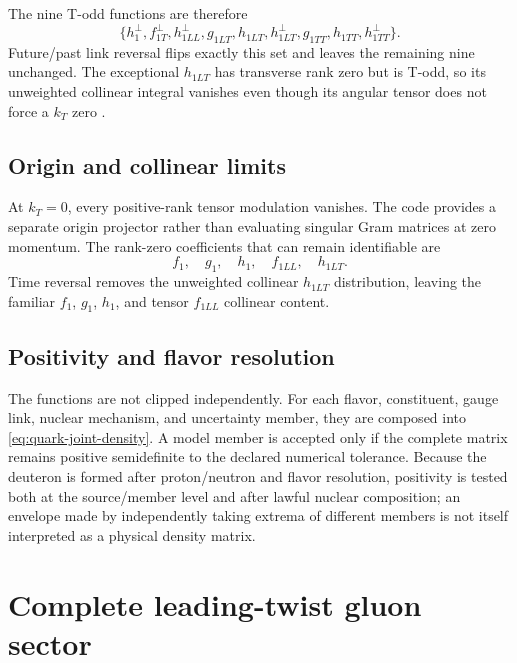 \documentclass[11pt,oneside]{book}
\begin{document}
The nine T-odd functions are therefore
\begin{equation}
 \{h_1^\perp,f_{1T}^\perp,h_{1LL}^\perp,g_{1LT},h_{1LT},
 h_{1LT}^\perp,g_{1TT},h_{1TT},h_{1TT}^\perp\}.
 \label{eq:quark-todd-set}
\end{equation}
Future/past link reversal flips exactly this set and leaves the remaining nine unchanged.  The exceptional $h_{1LT}$ has transverse rank zero but is T-odd, so its unweighted collinear integral vanishes even though its angular tensor does not force a $k_T$ zero \cite{VanDaal2016,KumanoSong2021}.

\section{Origin and collinear limits}

At $k_T=0$, every positive-rank tensor modulation vanishes.  The code provides a separate origin projector rather than evaluating singular Gram matrices at zero momentum.  The rank-zero coefficients that can remain identifiable are
\begin{equation}
 f_1,\quad g_1,\quad h_1,\quad f_{1LL},\quad h_{1LT}.
 \label{eq:quark-origin-set}
\end{equation}
Time reversal removes the unweighted collinear $h_{1LT}$ distribution, leaving the familiar $f_1$, $g_1$, $h_1$, and tensor $f_{1LL}$ collinear content.

\section{Positivity and flavor resolution}

The functions are not clipped independently.  For each flavor, constituent, gauge link, nuclear mechanism, and uncertainty member, they are composed into \cref{eq:quark-joint-density}.  A model member is accepted only if the complete matrix remains positive semidefinite to the declared numerical tolerance.  Because the deuteron is formed after proton/neutron and flavor resolution, positivity is tested both at the source/member level and after lawful nuclear composition; an envelope made by independently taking extrema of different members is not itself interpreted as a physical density matrix.

\chapter{Complete leading-twist gluon sector}
\label{chap:gluons}
\end{document}
